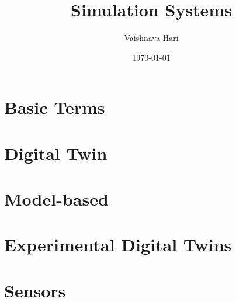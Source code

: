 \documentclass[a4paper]{article}
\title{Simulation Systems}
\author{Vaishnava Hari}
\date{\today}
\begin{document}
\maketitle

\section{Basic Terms}


\section{Digital Twin}


\section{Model-based}


\section{Experimental Digital Twins}


\section{Sensors}

\end{document}
